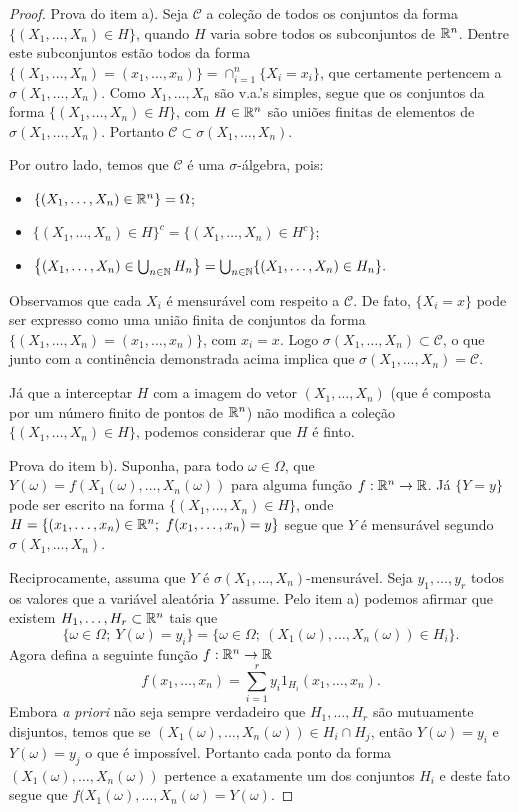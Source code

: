 \begin{proof}
Prova do item a). Seja $\mathcal{C}$ a coleção de todos os conjuntos da forma 
$\{(X_1,\ldots,X_n)\in H\}$, quando $H$ varia sobre todos os 
subconjuntos de $\mathbb{R}^n$. 
Dentre este subconjuntos estão todos da forma 
$\{(X_1,\ldots,X_n)=(x_1,\ldots,x_n)\}=\cap_{i=1}^n \{X_i=x_i\}$,
que certamente pertencem a $\sigma(X_1,\ldots,X_n)$.
Como $X_1,\ldots,X_n$ são v.a.'s simples, segue que os conjuntos da 
forma $\{(X_1,\ldots,X_n)\in H\}$, com $H\in \mathbb{R}^n$ são uniões 
finitas de elementos de $\sigma(X_1,\ldots,X_n)$.
Portanto $\mathcal{C}\subset \sigma(X_1,\ldots,X_n)$.


Por outro lado, temos que $\mathcal{C}$ é uma $\sigma$-álgebra,
pois: 
\begin{itemize}
\item
$\{(X_1,\ldots,X_n)\in \mathbb{R}^n\}=\Omega$; 

\item
$\{(X_1,\ldots,X_n)\in H\}^c = \{(X_1,\ldots,X_n)\in H^c\}$;

\item 
$
\left\{ (X_1,\ldots,X_n)\in \bigcup_{n\in \mathbb{N}} H_n \right\} 
=
\bigcup_{n\in \mathbb{N}}\{(X_1,\ldots,X_n)\in H_n\}.
$
\end{itemize}
Observamos que cada $X_i$ é mensurável com respeito a
$\mathcal{C}$. De fato, $\{X_i=x\}$ pode ser expresso 
como uma união finita de conjuntos da forma 
$\{(X_1,\ldots,X_n)=(x_1,\ldots,x_n)\}$, com $x_i=x$.
Logo $\sigma(X_1,\ldots,X_n)\subset \mathcal{C}$, 
o que junto com a continência demonstrada acima
implica que $\sigma(X_1,\ldots,X_n)= \mathcal{C}$.

Já que a interceptar $H$ com a imagem do 
vetor $(X_1,\ldots,X_n)$ (que é composta por um número 
finito de pontos de $\mathbb{R}^n$) não modifica a coleção 
$\{(X_1,\ldots,X_n)\in H\}$, podemos considerar 
que $H$ é finto.  



Prova do item b). Suponha, para todo $\omega\in\Omega$, que
$Y(\omega)=f(X_1(\omega),\ldots,X_n(\omega))$ para
alguma função $f:\mathbb{R}^n\to\mathbb{R}$. 
Já $\{Y=y\}$ pode ser escrito na forma $\{(X_1,\ldots,X_n)\in H\}$,
onde $H=\{(x_1,\ldots,x_n)\in \R^n ;\ f(x_1,\ldots,x_n)=y\}$
segue que $Y$ é mensurável segundo $\sigma(X_1,\ldots,X_n)$.


Reciprocamente, assuma que $Y$ é $\sigma(X_1,\ldots,X_n)$-mensurável.
Seja $y_1,\ldots,y_r$ todos os valores que a variável aleatória 
$Y$ assume. Pelo item a) podemos afirmar que existem 
$H_1,\ldots,H_r\subset \mathbb{R}^n$ tais que 
	\[
	\{\omega\in\Omega;\ Y(\omega)=y_i\}
	=
	\{\omega\in\Omega;\ (X_1(\omega),\ldots,X_n(\omega))\in H_i\}.
	\]
Agora defina a seguinte função $f:\mathbb{R}^n\to\mathbb{R}$
	\[
		f(x_1,\ldots,x_n)=\sum_{i=1}^r y_i 1_{H_i}(x_1,\ldots,x_n).
	\] 
Embora {\it a priori} não seja sempre verdadeiro que $H_1,\ldots,H_r$
são mutuamente disjuntos, temos que se 
$(X_1(\omega),\ldots,X_n(\omega))\in H_i\cap H_j$,
então $Y(\omega)=y_i$ e $Y(\omega)=y_j$ o que é impossível.
Portanto cada ponto da forma $(X_1(\omega),\ldots,X_n(\omega))$
pertence a exatamente um dos conjuntos $H_i$ e deste fato segue 
que $f(X_1(\omega),\ldots,X_n(\omega)=Y(\omega)$.
\end{proof}
